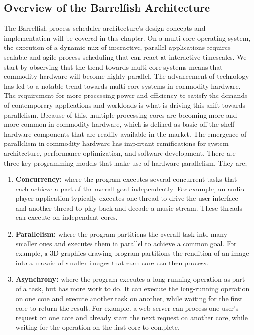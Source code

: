 \documentclass[16pt,a4paper]{article}
\begin{document}
\subsection{Overview of the Barrelfish Architecture}
The Barrelfish process scheduler architecture's design concepts and implementation will be covered in this chapter. On a multi-core operating system, the execution of a dynamic mix of interactive, parallel applications requires scalable and agile process scheduling that can react at interactive timescales. We start by observing that the trend towards multi-core systems means that commodity hardware will become highly parallel. The advancement of technology has led to a notable trend towards multi-core systems in commodity hardware. The requirement for more processing power and efficiency to satisfy the demands of contemporary applications and workloads is what is driving this shift towards parallelism. Because of this, multiple processing cores are becoming more and more common in commodity hardware, which is defined as basic off-the-shelf hardware components that are readily available in the market. The emergence of parallelism in commodity hardware has important ramifications for system architecture, performance optimization, and software development. There are three key programming models that make use of hardware parallelism. They are; 
\begin{enumerate}
\item \textbf{Concurrency: } where the program executes several concurrent tasks that each achieve a part of the overall goal independently. For example, an audio player application typically executes one thread to drive the user interface and another thread to play back and decode a music stream. These threads can execute on independent cores. 
\item \textbf{Parallelism: } where the program partitions the overall task into many smaller ones and executes them in parallel to achieve a common goal. For example, a 3D graphics drawing program partitions the rendition of an image into a mosaic of smaller images that each core can then process. 
\item \textbf{Asynchrony: } where the program executes a long-running operation as part of a task, but has more work to do. It can execute the long-running operation on one core and execute another task on another, while waiting for the first core to return the result. For example, a web server can process one user’s request on one core and already start the next request on another core, while waiting for the operation on the first core to complete.
\end{enumerate}
\end{document}
